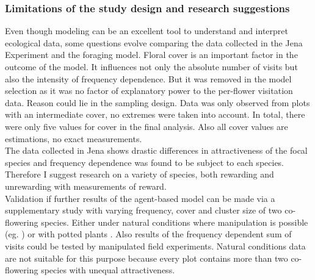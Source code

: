 \subsubsection*{Limitations of the study design and research suggestions}
Even though modeling can be an excellent tool to understand and interpret ecological data, some questions evolve comparing the data collected in the Jena Experiment and the foraging model. Floral cover is an important factor in the outcome of the model. It influences not only the absolute number of visits but also the intensity of frequency dependence. But it was removed in the model selection as it was no factor of explanatory power to the per-flower visitation data. 
Reason could lie in the sampling design. Data was only observed from plots with an intermediate cover, no extremes were taken into account. In total, there were only five values for cover in the final analysis. Also all cover values are estimations, no exact measurements.\\
The data collected in Jena shows drastic differences in attractiveness of the focal species and frequency dependence was found to be subject to each species. Therefore I suggest research on a variety of species, both rewarding and unrewarding with measurements of reward.\\
Validation if further results of the agent-based model can be made via a supplementary study with varying frequency, cover and cluster size of two co-flowering species. Either under natural conditions where manipulation is possible (eg. \citealt{Eckhart2006frequency,essenberg2012explaining}) or with potted plants \citep{epperson1987frequency}. Also results of the frequency dependent sum of visits could be tested by manipulated field experiments. Natural conditions data are not suitable for this purpose because every plot contains more than two co-flowering species with unequal attractiveness.  
